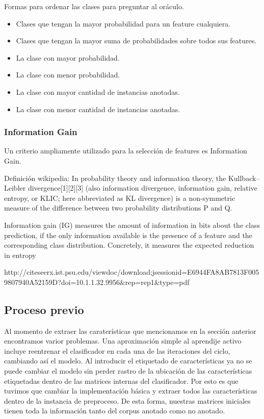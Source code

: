 Formas para ordenar las clases para preguntar al oráculo.
\begin{itemize}
	\item Clases que tengan la mayor probabilidad para un feature cualquiera.
	\item Clases que tengan la mayor suma de probabilidades sobre todos sus features.
	\item La clase con mayor probabilidad.
	\item La clase con menor probabilidad.
	\item La clase con mayor cantidad de instancias anotadas.
	\item La clase con menor cantidad de instancias anotadas.
\end{itemize}

\subsubsection{Information Gain}
Un criterio ampliamente utilizado para la selección de features es Information Gain.

Definición wikipedia:
In probability theory and information theory, the Kullback–Leibler divergence[1][2][3] (also information divergence, information gain, relative entropy, or KLIC; here abbreviated as KL divergence) is a non-symmetric measure of the difference between two probability distributions P and Q.

\citet{infgain}
Information gain (IG) measures the amount of information in bits about the
class prediction, if the only information available is the presence of a feature
and the corresponding class distribution. Concretely, it measures the expected
reduction in entropy

http://citeseerx.ist.psu.edu/viewdoc/download;jsessionid=E6944FA8AB7813F0059807940A52159D?doi=10.1.1.32.9956&rep=rep1&type=pdf


\subsection{Proceso previo}

Al momento de extraer las caraterísticas que mencionamos en la sección anterior encontramos varior problemas. Una aproximación simple al aprendije activo incluye reentrenar el clasificador en cada una de las iteraciones del ciclo, cambiando así el modelo. Al introducir el etiquetado de características ya no se puede cambiar el modelo sin perder rastro de la ubicación de las características etiquetadas dentro de las matrices internas del clasificador. Por esto es que tuvimos que cambiar la implementación básica y extraer todos las características dentro de la instancia de preproceso. De esta forma, nuestras matrices iniciales tienen toda la información tanto del corpus anotado como no anotado.
